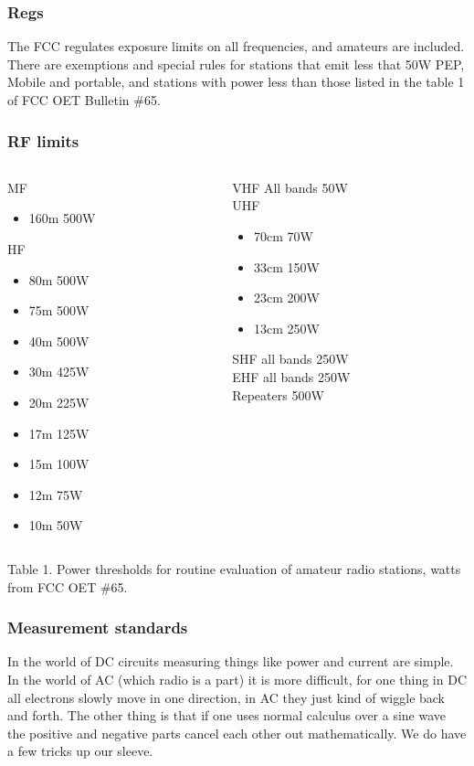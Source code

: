 \documentclass[10pt]{beamer}
\begin{document}
\begin{frame}
\frametitle{Regs}
The FCC regulates exposure limits on all frequencies, and amateurs are included.\\
There are exemptions and special rules for stations that emit less that 50W PEP, Mobile and portable, and stations with power less than those listed in the table 1 of FCC OET Bulletin \#65.
\end{frame}

\begin{frame}
\frametitle{RF limits}
\begin{columns}
\begin{column}{.5\textwidth}
MF
\begin{itemize}
\item 160m 500W
\end{itemize}
HF
\begin{itemize}
\item 80m 500W
\item 75m 500W
\item 40m 500W
\item 30m 425W
\item 20m 225W
\item 17m 125W
\item 15m 100W
\item 12m 75W
\item 10m 50W
\end{itemize}
\end{column}
\begin{column}{.5\textwidth}
VHF All bands 50W\\
UHF
\begin{itemize}
\item 70cm 70W
\item 33cm 150W
\item 23cm 200W
\item 13cm 250W
\end{itemize}
SHF all bands 250W\\
EHF all bands 250W\\
Repeaters 500W
\end{column}
\end{columns}
Table 1. Power thresholds for routine evaluation of amateur radio stations, watts from FCC OET \#65.
\end{frame}

\begin{frame}
\frametitle{Measurement standards}
In the world of DC circuits measuring things like power and current are simple. In the world of AC (which radio is a part) it is more difficult, for one thing in DC all electrons slowly move in one direction, in AC they just kind of wiggle back and forth. The other thing is that if one uses normal calculus over a sine wave the positive and negative parts cancel each other out mathematically. We do have a few tricks up our sleeve.
\end{frame}
\end{document}

